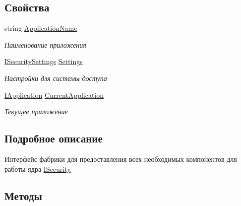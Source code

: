 \subsection*{Свойства}
\begin{DoxyCompactItemize}
\item 
string \hyperlink{interface_security_1_1_interfaces_1_1_i_security_factory_ada601a36a0c0a5dfc55a9433fb617055}{Application\+Name}
\begin{DoxyCompactList}\small\item\em Наименование приложения \end{DoxyCompactList}\item 
\hyperlink{interface_security_1_1_interfaces_1_1_i_security_settings}{I\+Security\+Settings} \hyperlink{interface_security_1_1_interfaces_1_1_i_security_factory_a46941edf494ff525d842a665548b59f4}{Settings}
\begin{DoxyCompactList}\small\item\em Настройки для системы доступа \end{DoxyCompactList}\item 
\hyperlink{interface_security_1_1_interfaces_1_1_model_1_1_i_application}{I\+Application} \hyperlink{interface_security_1_1_interfaces_1_1_i_security_factory_a83db1d288369e763449e69b6c1bc992f}{Current\+Application}
\begin{DoxyCompactList}\small\item\em Текущее приложение \end{DoxyCompactList}\end{DoxyCompactItemize}


\subsection{Подробное описание}
Интерфейс фабрики для предоставления всех необходимых компонентов для работы ядра \hyperlink{interface_security_1_1_interfaces_1_1_i_security}{I\+Security} 



\subsection{Методы}
\mbox{\label{interface_security_1_1_interfaces_1_1_i_security_factory_a7c6e1914da204e43cc140647f4c2b384}} 
